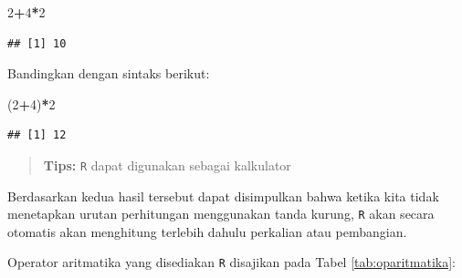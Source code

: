\documentclass[
]{book}
\newenvironment{Shaded}{\begin{snugshade}}{\end{snugshade}}
\newcommand{\DecValTok}[1]{\textcolor[rgb]{0.00,0.00,0.81}{#1}}
\newcommand{\NormalTok}[1]{#1}
\newcommand{\SpecialCharTok}[1]{\textcolor[rgb]{0.81,0.36,0.00}{\textbf{#1}}}
\theoremstyle{definition}
\theoremstyle{definition}
\theoremstyle{definition}
\theoremstyle{definition}
\theoremstyle{remark}
\begin{document}
\begin{Shaded}
\begin{Highlighting}[]
\DecValTok{2}\SpecialCharTok{+}\DecValTok{4}\SpecialCharTok{*}\DecValTok{2}
\end{Highlighting}
\end{Shaded}

\begin{verbatim}
## [1] 10
\end{verbatim}

Bandingkan dengan sintaks berikut:

\begin{Shaded}
\begin{Highlighting}[]
\NormalTok{(}\DecValTok{2}\SpecialCharTok{+}\DecValTok{4}\NormalTok{)}\SpecialCharTok{*}\DecValTok{2}
\end{Highlighting}
\end{Shaded}

\begin{verbatim}
## [1] 12
\end{verbatim}

\begin{quote}
\textbf{Tips:} \texttt{R} dapat digunakan sebagai kalkulator
\end{quote}

Berdasarkan kedua hasil tersebut dapat disimpulkan bahwa ketika kita tidak menetapkan urutan perhitungan menggunakan tanda kurung, \texttt{R} akan secara otomatis akan menghitung terlebih dahulu perkalian atau pembangian.

Operator aritmatika yang disediakan \texttt{R} disajikan pada Tabel \ref{tab:oparitmatika}:
\end{document}
